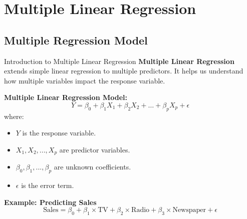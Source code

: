 \documentclass[aspectratio=169,xcolor=dvipsnames]{beamer}
\begin{document}

\section{Multiple Linear Regression}
\subsection{Multiple Regression Model}
\begin{frame}{Introduction to Multiple Linear Regression}
\textbf{Multiple Linear Regression} extends simple linear regression to multiple predictors. It helps us understand how multiple variables impact the response variable.


    \bigskip

    \textbf{Multiple Linear Regression Model:}
    \begin{equation}
        Y = \beta_0 + \beta_1 X_1 + \beta_2 X_2 + \dots + \beta_p X_p + \epsilon
    \end{equation}
    where:
    \begin{itemize}
        \item \( Y \) is the response variable.
        \item \( X_1, X_2, ..., X_p \) are predictor variables.
        \item \( \beta_0, \beta_1, ..., \beta_p \) are unknown coefficients.
        \item \( \epsilon \) is the error term.
    \end{itemize}

    \bigskip

    \textbf{Example: Predicting Sales}
    \begin{equation}
        \text{Sales} = \beta_0 + \beta_1 \times \text{TV} + \beta_2 \times \text{Radio} + \beta_3 \times \text{Newspaper} + \epsilon
    \end{equation}
\end{frame}

\end{document}
